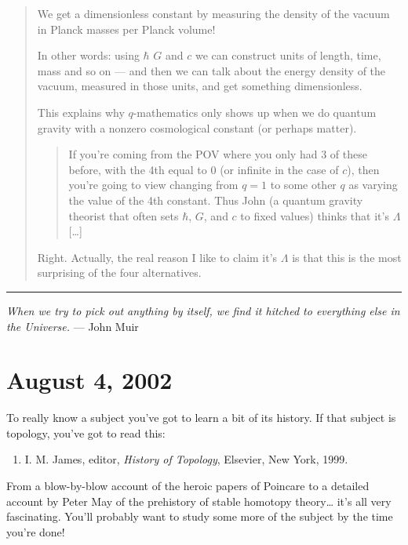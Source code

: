 \documentclass{article}
\def\tightlist{}
\begin{document}
\begin{quote}
We get a dimensionless constant by measuring the density of the vacuum
in Planck masses per Planck volume!

In other words: using \(\hbar\) \(G\) and \(c\) we can construct units
of length, time, mass and so on --- and then we can talk about the
energy density of the vacuum, measured in those units, and get something
dimensionless.

This explains why \(q\)-mathematics only shows up when we do quantum
gravity with a nonzero cosmological constant (or perhaps matter).

\begin{quote}
If you're coming from the POV where you only had 3 of these before, with
the 4th equal to 0 (or infinite in the case of \(c\)), then you're going
to view changing from \(q = 1\) to some other \(q\) as varying the value
of the 4th constant. Thus John (a quantum gravity theorist that often
sets \(\hbar\), \(G\), and \(c\) to fixed values) thinks that it's
\(\Lambda\) {[}\ldots{]}
\end{quote}

Right. Actually, the real reason I like to claim it's \(\Lambda\) is
that this is the most surprising of the four alternatives.
\end{quote}

\begin{center}\rule{0.5\linewidth}{0.5pt}\end{center}

\emph{When we try to pick out anything by itself, we find it hitched to
everything else in the Universe.} --- John Muir



\hypertarget{week184}{%
\section{August 4, 2002}\label{week184}}

To really know a subject you've got to learn a bit of its history. If
that subject is topology, you've got to read this:

\begin{enumerate}
\def\labelenumi{\arabic{enumi})}
\tightlist
\item
  I. M. James, editor, \emph{History of Topology}, Elsevier, New York,
  1999.
\end{enumerate}

From a blow-by-blow account of the heroic papers of Poincare to a
detailed account by Peter May of the prehistory of stable homotopy
theory\ldots{} it's all very fascinating. You'll probably want to study
some more of the subject by the time you're done!
\end{document}
